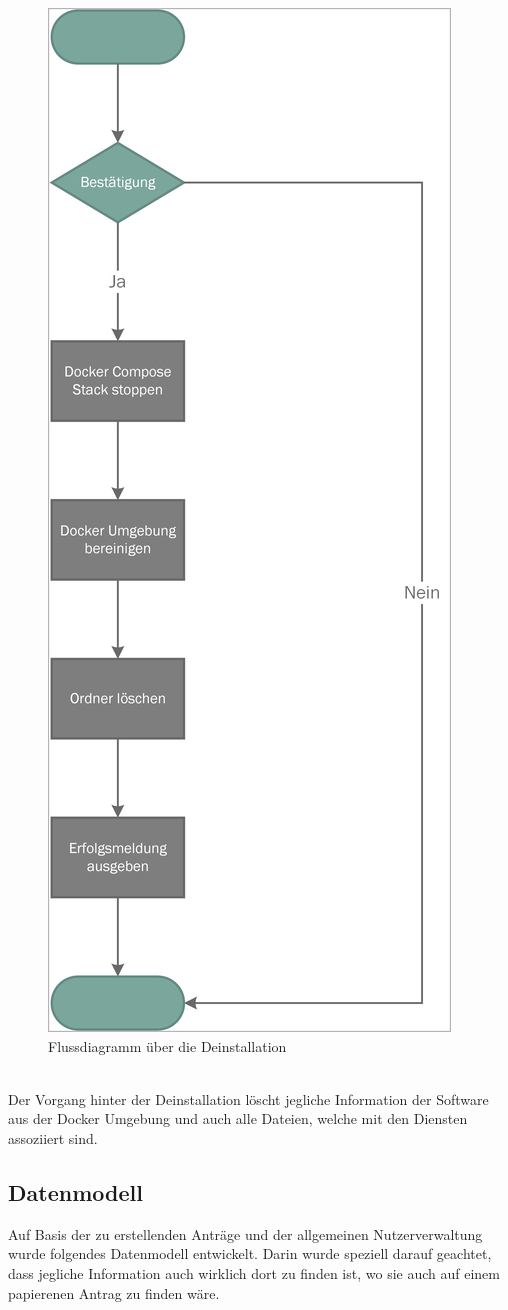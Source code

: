 \begin{figure}[H]
	\centering
	\includegraphics[width=0.48\linewidth]{images/mbeier_konzept/Purge_border}
	\caption[Flussdiagramm über die Deinstallation]{Flussdiagramm über die Deinstallation}
	\label{fig:purge}
\end{figure}
~\\
Der Vorgang hinter der Deinstallation löscht jegliche Information der Software aus der Docker Umgebung und auch alle Dateien, welche mit den Diensten assoziiert sind.

\newpage

\subsection{Datenmodell}

Auf Basis der zu erstellenden Anträge und der allgemeinen Nutzerverwaltung wurde folgendes Datenmodell entwickelt. Darin wurde speziell darauf geachtet, dass jegliche Information auch wirklich dort zu finden ist, wo sie auch auf einem papierenen Antrag zu finden wäre. 

